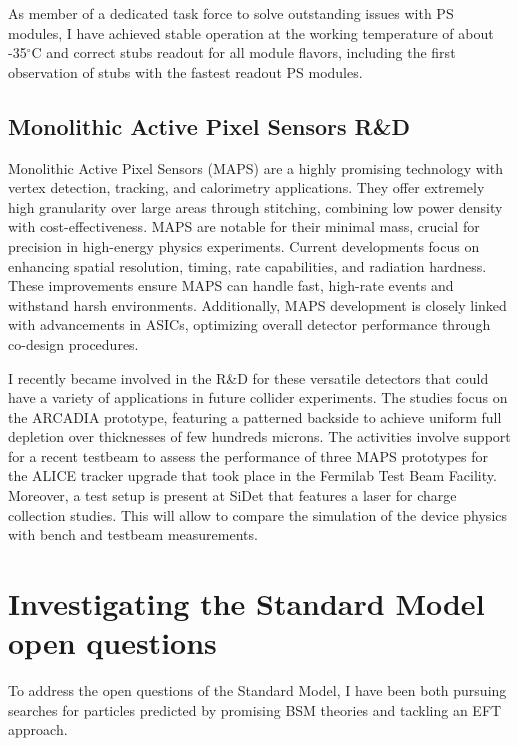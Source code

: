 {\begin{flushleft}
As member of a dedicated task force to solve outstanding issues with PS modules, I have achieved stable operation at the working temperature of about -35$^{\circ}$C and correct stubs readout for all module flavors, including the first observation of stubs with the fastest readout PS modules.  

\vspace{\baselineskip} 
\subsection{Monolithic Active Pixel Sensors R\&D}
\vspace{\baselineskip}
Monolithic Active Pixel Sensors (MAPS) are a highly promising technology with vertex detection, tracking, and calorimetry applications. They offer extremely high granularity over large areas through stitching, combining low power density with cost-effectiveness. MAPS are notable for their minimal mass, crucial for precision in high-energy physics experiments.
Current developments focus on enhancing spatial resolution, timing, rate capabilities, and radiation hardness. These improvements ensure MAPS can handle fast, high-rate events and withstand harsh environments. Additionally, MAPS development is closely linked with advancements in ASICs, optimizing overall detector performance through co-design procedures.

I recently became involved in the R\&D for these versatile detectors that could have a variety of applications in future collider experiments. The studies focus on the ARCADIA prototype, featuring a patterned backside to achieve uniform full depletion over thicknesses of few hundreds microns. The activities involve support for a recent testbeam to assess the performance of three MAPS prototypes for the ALICE tracker upgrade that took place in the Fermilab Test Beam Facility. Moreover, a test setup is present at SiDet that features a laser for charge collection studies. This will allow to compare the simulation of the device physics with bench and testbeam measurements.


\vspace{\baselineskip}
\section{Investigating the Standard Model open questions}
\vspace{\baselineskip}
To address the open questions of the Standard Model, I have been both pursuing searches for particles predicted by promising BSM theories and tackling an EFT approach.


\end{flushleft}}
